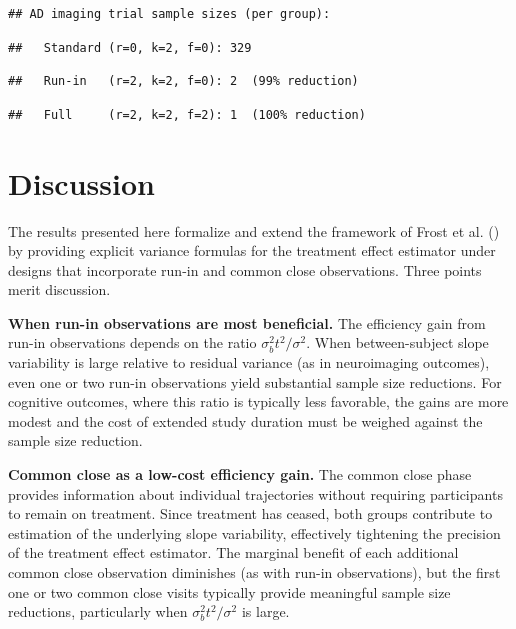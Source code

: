 \documentclass[
  11pt,
]{article}
\begin{document}
\begin{verbatim}
## AD imaging trial sample sizes (per group):
\end{verbatim}

\begin{verbatim}
##   Standard (r=0, k=2, f=0): 329
\end{verbatim}

\begin{verbatim}
##   Run-in   (r=2, k=2, f=0): 2  (99% reduction)
\end{verbatim}

\begin{verbatim}
##   Full     (r=2, k=2, f=2): 1  (100% reduction)
\end{verbatim}

\section{Discussion}\label{discussion}

The results presented here formalize and extend the framework of Frost
et al. () by
providing explicit variance formulas for the treatment effect estimator
under designs that incorporate run-in and common close observations.
Three points merit discussion.

\textbf{When run-in observations are most beneficial.} The efficiency
gain from run-in observations depends on the ratio
\(\sigma_b^2 t^2 / \sigma^2\). When between-subject slope variability is
large relative to residual variance (as in neuroimaging outcomes), even
one or two run-in observations yield substantial sample size reductions.
For cognitive outcomes, where this ratio is typically less favorable,
the gains are more modest and the cost of extended study duration must
be weighed against the sample size reduction.

\textbf{Common close as a low-cost efficiency gain.} The common close
phase provides information about individual trajectories without
requiring participants to remain on treatment. Since treatment has
ceased, both groups contribute to estimation of the underlying slope
variability, effectively tightening the precision of the treatment
effect estimator. The marginal benefit of each additional common close
observation diminishes (as with run-in observations), but the first one
or two common close visits typically provide meaningful sample size
reductions, particularly when \(\sigma_b^2 t^2 / \sigma^2\) is large.
\end{document}
